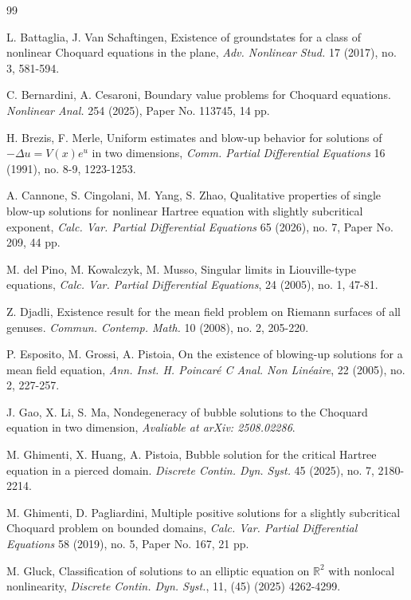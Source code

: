 \documentclass[11pt]{article}
\begin{document}
\begin{thebibliography}{99}

L. Battaglia, J. Van Schaftingen, Existence of groundstates for a class of nonlinear Choquard equations in the plane, \emph{Adv. Nonlinear Stud.} 17 (2017), no. 3, 581-594.

C. Bernardini, A. Cesaroni, Boundary value problems for Choquard equations. \emph{Nonlinear Anal.} 254 (2025), Paper No. 113745, 14 pp.

H. Brezis, F. Merle, Uniform estimates and blow-up behavior for solutions of $-\Delta u=V(x)e^u$ in two dimensions, \emph{Comm. Partial Differential Equations} 16 (1991), no. 8-9, 1223-1253.

A. Cannone, S. Cingolani, M. Yang, S. Zhao, Qualitative properties of single blow-up solutions for nonlinear Hartree equation with slightly subcritical exponent, \emph{
Calc. Var. Partial Differential Equations} 65 (2026), no. 7, Paper No. 209, 44 pp.

M. del Pino, M. Kowalczyk, M. Musso, Singular limits in Liouville-type equations, \emph{Calc. Var. Partial Differential Equations}, 24 (2005), no. 1, 47-81.

Z. Djadli, Existence result for the mean field problem on Riemann surfaces of all genuses. \emph{Commun. Contemp. Math.} 10 (2008), no. 2, 205-220.

P. Esposito, M. Grossi, A. Pistoia, On the existence of blowing-up solutions for a mean field equation, \emph{Ann. Inst. H. Poincar\'e C Anal. Non Lin\'eaire}, 22 (2005), no. 2, 227-257.

J. Gao, X. Li, S. Ma, Nondegeneracy of bubble solutions to the Choquard equation in two dimension, \emph{Avaliable at arXiv: 2508.02286}.

M. Ghimenti, X. Huang, A. Pistoia, Bubble solution for the critical Hartree equation in a pierced domain. \emph{Discrete Contin. Dyn. Syst.} 45 (2025), no. 7, 2180-2214.

M. Ghimenti, D. Pagliardini, Multiple positive solutions for a slightly subcritical Choquard problem on bounded domains, \emph{Calc. Var. Partial Differential Equations} 58 (2019), no. 5, Paper No. 167, 21 pp.

M. Gluck, Classification of solutions to an elliptic equation on $\mathbb R^2$ with nonlocal nonlinearity, \emph{Discrete Contin. Dyn. Syst.}, 11, (45) (2025) 4262-4299.


\end{thebibliography}
\end{document}
